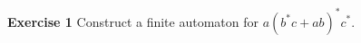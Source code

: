 \documentclass{article}
\begin{document}
\textbf{Exercise 1} Construct a finite automaton for $a(b^*c+ab)^*c^*$.
\end{document}
